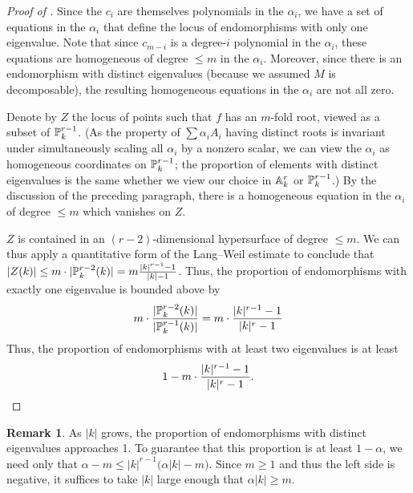 \documentclass[12pt]{amsart}
\theoremstyle{theorem}
\numberwithin{thm}{section}
\theoremstyle{definition}
\newtheorem{rem}[thm]{Remark}
\begin{document}
\begin{proof}[Proof of ]
  Since the $c_i$ are themselves polynomials in the $\alpha_i$, we have a set of equations in the $\alpha_i$ that define the locus of endomorphisms with only one eigenvalue.
  Note that since $c_{m-i}$ is a degree-$i$ polynomial in the $\alpha_i$, these equations are homogeneous of degree $\leq m$ in the $\alpha_i$.
  Moreover, since there is an endomorphism with distinct eigenvalues (because we assumed $M$ is decomposable), the resulting homogeneous equations in the $\alpha_i$ are not all zero.

  Denote by $Z$ the locus of points such that $f$ has an $m$-fold root, viewed as a subset of $\P_k^{r-1}$.
  (As the property of $\sum \alpha_i A_i$ having distinct roots is invariant under simultaneously scaling all $\alpha_i$ by a nonzero scalar, we can view the $\alpha_i$ as homogeneous coordinates on $\P_k^{r-1}$; the proportion of elements with distinct eigenvalues is the same whether we view our choice in $\AA_k^r$ or $\P_k^{r-1}$.)
  By the discussion of the preceding paragraph, there is a homogeneous equation in the $\alpha_i$ of degree $\leq m$ which vanishes on $Z$.

  $Z$ is contained in an $(r-2)$-dimensional hypersurface of degree $\leq m$.
  We can thus apply a quantitative form of the Lang--Weil estimate \cite[Proposition~12.1]{GL02} to conclude that
  $|Z(k)| \leq m \cdot  |\P_k^{r-2}(k)|=m \frac{|k|^{r-1}-1}{|k|-1}$.
  Thus, the proportion of endomorphisms with exactly one eigenvalue is bounded above by
  $$ m \cdot \frac{ |\P_k^{r-2}(k)|}{|\P_k^{r-1}(k)|} = m \cdot \frac{|k|^{r-1}-1}{|k|^{r}-1} $$
  Thus, the proportion of endomorphisms with at least two eigenvalues is at least
  \[ 1 - m \cdot \frac{|k|^{r-1}-1}{|k|^{r}-1} . \hfill \qedhere \]
\end{proof}

\begin{rem}
  As $|k|$ grows, the proportion of endomorphisms with distinct eigenvalues approaches 1. To guarantee that this proportion is at least $1-\alpha$, we need only
that $ \alpha-m\leq |k|^{r-1} \bigl(\alpha|k|-m\bigr). $
  Since $m \geq 1$ and thus the left side is negative, it suffices to take $|k|$ large enough that $\alpha|k|\geq m$.
\end{rem}
\end{document}
